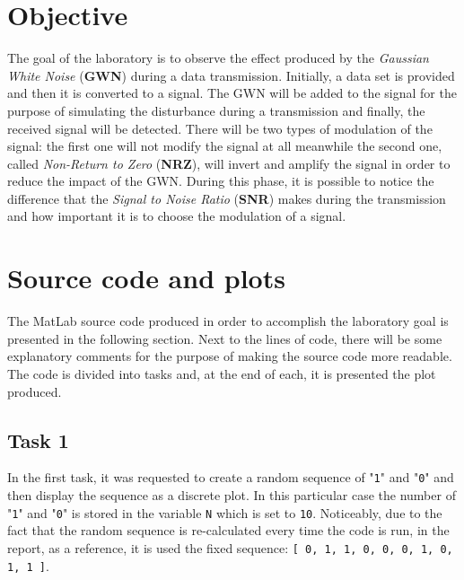 \section*{Objective}\label{objective}
The goal of the laboratory is to observe the effect produced by the \textit{Gaussian White Noise} (\textbf{GWN}) during a data transmission. Initially, a data set is provided and then it is converted to a signal. The GWN will be added to the signal for the purpose of simulating the disturbance during a transmission and finally, the received signal will be detected. There will be two types of modulation of the signal: the first one will not modify the signal at all meanwhile the second one, called \textit{Non-Return to Zero} (\textbf{NRZ}), will invert and amplify the signal in order to reduce the impact of the GWN. During this phase, it is possible to notice the difference that the \textit{Signal to Noise Ratio} (\textbf{SNR}) makes during the transmission and how important it is to choose the modulation of a signal.

% 
% 
\section*{Source code and plots} \label{source_code_plots}
The MatLab source code produced in order to accomplish the laboratory goal is presented in the following section. Next to the lines of code, there will be some explanatory comments for the purpose of making the source code more readable. The code is divided into tasks and, at the end of each, it is presented the plot produced.

\lstset{style = MatLab}

\subsection*{Task 1}
In the first task, it was requested to create a random sequence of "\texttt{1}" and "\texttt{0}" and then display the sequence as a discrete plot. In this particular case the number of "\texttt{1}" and "\texttt{0}" is stored in the variable \texttt{N} which is set to \texttt{10}. Noticeably, due to the fact that the random sequence is re-calculated every time the code is run, in the report, as a reference, it is used the fixed sequence: \texttt{[ 0, 1, 1, 0, 0, 0, 1, 0, 1, 1 ]}.

